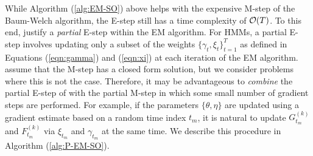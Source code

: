 While Algorithm (\ref{alg:EM-SO}) above helps with the expensive M-step of the Baum-Welch algorithm, the E-step still has a time complexity of $\mathcal{O}(T)$.
To this end, \citet{Neal:1998} justify a \textit{partial} E-step within the EM algorithm. For HMMs, a partial E-step involves updating only a subset of the weights $\{\gamma_t,\xi_t\}_{t=1}^T$ as defined in Equations (\ref{eqn:gamma}) and (\ref{eqn:xi}) at each iteration of the EM algorithm. \citet{Neal:1998} assume that the M-step has a closed form solution, but we consider problems where this is not the case. 
Therefore, it may be advantageous to \textit{combine} the partial E-step of \citet{Neal:1998} with the partial M-step in which some small number of gradient steps are performed. For example, if the parameters $\{\theta, \eta\}$ are updated using a gradient estimate based on a random time index $t_m$, it is natural to update $G_{t_m}^{(k)}$ and $F_{t_m}^{(k)}$ via $\xi_{t_m}$ and $\gamma_{t_m}$ at the same time. We describe this procedure in Algorithm (\ref{alg:P-EM-SO}).


